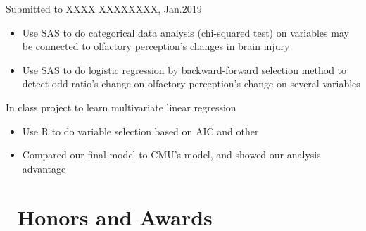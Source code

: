 \documentclass{resume}
\begin{document}
Submitted to XXXX XXXXXXXX, Jan.2019
\begin{itemize}
  \item Use SAS to do categorical data analysis (chi-squared test) on variables may be connected to olfactory perception's changes in brain injury 
  \item Use SAS to do logistic regression by backward-forward selection method to detect odd ratio's change on olfactory perception's change on several variables 
\end{itemize}

In class project to learn multivariate linear regression
\begin{itemize}
  \item Use R to do variable selection based on AIC and other  
  \item Compared our final model to CMU's model, and showed our analysis advantage
\end{itemize}


\section{\faHeartO\ Honors and Awards}


%
%
\end{document}
